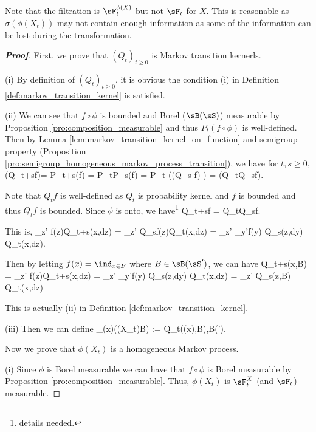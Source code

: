 \begin{remark}
Note that the filtration is $\sF_t^{\phi(X)}$ but not $\sF_t$ for $X$. This is reasonable as $\sigma(\phi(X_t))$ may not contain enough information as some of the information can be lost during the transformation.
\end{remark}

\begin{proof}[\bf Proof]
First, we prove that $(Q_t)_{t\geq 0}$ is Markov transition kernerls.

\ben
\item [(i)] By definition of $(Q_t)_{t\geq 0}$, it is obvious the condition (i) in Definition \ref{def:markov_transition_kernel} is satisfied.

\item [(ii)] We can see that $f\circ \phi$ is bounded and Borel ($\sB(\sS)$) measurable by Proposition \ref{pro:composition_measurable} and thus $P_t(f\circ \phi)$ is well-defined. Then by Lemma \ref{lem:markov_transition_kernel_on_function} and semigroup property (Proposition \ref{pro:semigroup_homogeneous_markov_process_transition}), we have for $t,s\geq 0$,
\be
(Q_{t+s}f)\circ \phi = P_{t+s}(f\circ \phi) = P_tP_s(f\circ \phi) = P_t ((Q_s f) \circ \phi) = (Q_tQ_sf)\circ \phi.
\ee

Note that $Q_t f$ is well-defined as $Q_t$ is probability kernel and $f$ is bounded and thus $Q_tf$ is bounded. Since $\phi$ is onto, we have\footnote{details needed.}
\be
Q_{t+s}f = Q_tQ_sf.
\ee

This is,
\be
\int_{z\in \sS'} f(z)Q_{t+s}(x,dz) = \int_{z\in \sS'} Q_sf(z)Q_{t}(x,dz) = \int_{z\in \sS'} \int_{y\in \sS'}f(y) Q_s(z,dy) Q_{t}(x,dz).
\ee

Then by letting $f(x) = \ind_{x\in B}$ where $B\in \sB(\sS')$, we can have 
\be
Q_{t+s}(x,B) = \int_{z\in \sS'} f(z)Q_{t+s}(x,dz)  = \int_{z\in \sS'} \int_{y\in \sS'}f(y) Q_s(z,dy) Q_t(x,dz) = \int_{z\in \sS'} Q_s(z,B) Q_t(x,dz)
\ee

This is actually (ii) in Definition \ref{def:markov_transition_kernel}.

\item [(iii)] Then we can define 
\be
\Q_{\phi(x)}(\phi(X_t)\in B) := Q_t({\phi(x)},B),\qquad \forall B\in \sB(\sS').
\ee
\een

Now we prove that $\phi(X_t)$ is a homogeneous Markov process.
\ben
\item [(i)] Since $\phi$ is Borel measurable we can have that $f\circ \phi$ is Borel measurable by Proposition \ref{pro:composition_measurable}. Thus, $\phi(X_{t})$ is $\sF_t^{X}$ (and $\sF_t$)-measurable.


\end{proof}
